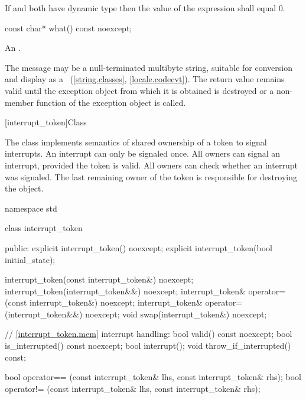 {\begin{itemdescr}
  \pnum \postconditions If  and  both have dynamic type 
        then the value of the expression  shall equal 0.
\end{itemdescr}

%
\begin{itemdecl}
const char* what() const noexcept;
\end{itemdecl}

\begin{itemdescr}
\pnum
\returns
An  \ntbs{}.

\pnum
\remarks
The message may be a null-terminated multibyte string,
suitable for conversion and display as a
~(\ref{string.classes}, \ref{locale.codecvt}).
The return value remains valid until the exception object from which
it is obtained is destroyed or a non-
member function of the exception object is called.
\end{itemdescr}


%
[interrupt_token]{Class }

\pnum
{}%
The class  implements semantics of shared ownership of a 
token to signal interrupts.
An interrupt can only be signaled once.
All owners can signal an interrupt, provided the token is valid.
All owners can check whether an interrupt was signaled.
The last remaining owner of the token is responsible for destroying
the object.

\begin{codeblock}
namespace std {
  class interrupt_token {
  public:
    explicit interrupt_token() noexcept;
    explicit interrupt_token(bool initial_state);

    interrupt_token(const interrupt_token&) noexcept;
    interrupt_token(interrupt_token&&) noexcept;
    interrupt_token& operator=(const interrupt_token&) noexcept;
    interrupt_token& operator=(interrupt_token&&) noexcept;
    void swap(interrupt_token&) noexcept;

    // \ref{interrupt_token.mem} interrupt handling:
    bool valid() const noexcept;
    bool is_interrupted() const noexcept;
    bool interrupt();
    void throw_if_interrupted() const;
  }
}

bool operator== (const interrupt_token& lhs, const interrupt_token& rhs);
bool operator!= (const interrupt_token& lhs, const interrupt_token& rhs);
\end{codeblock}

}
